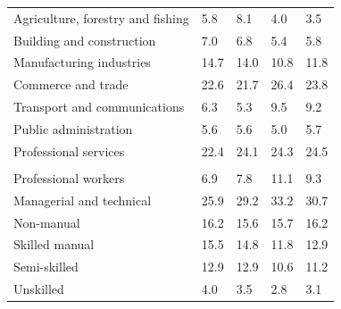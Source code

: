 \documentclass{article}
\begin{document}
\begin{table}[h]
\begin{tabular}{KTTTT}
    \hline
Agriculture, forestry and fishing  & 5.8& 8.1& 4.0& 3.5\\
Building and construction & 7.0& 6.8& 5.4& 5.8\\
Manufacturing industries & 14.7& 14.0& 10.8& 11.8\\
Commerce and trade  & 22.6& 21.7& 26.4& 23.8\\
Transport and communications  & 6.3& 5.3& 9.5& 9.2\\
Public administration & 5.6& 5.6& 5.0& 5.7\\
Professional services & 22.4& 24.1& 24.3& 24.5\\
\hline
    \\ 
    \hline
Professional workers  &  6.9&  7.8 & 11.1&  9.3\\
Managerial and technical & 25.9& 29.2& 33.2& 30.7\\
Non-manual & 16.2& 15.6& 15.7& 16.2\\
Skilled manual & 15.5& 14.8& 11.8& 12.9\\
Semi-skilled & 12.9& 12.9& 10.6& 11.2\\
Unskilled  & 4.0& 3.5& 2.8& 3.1\\
\end{tabular}
\end{table}
\pagebreak
\end{document}
